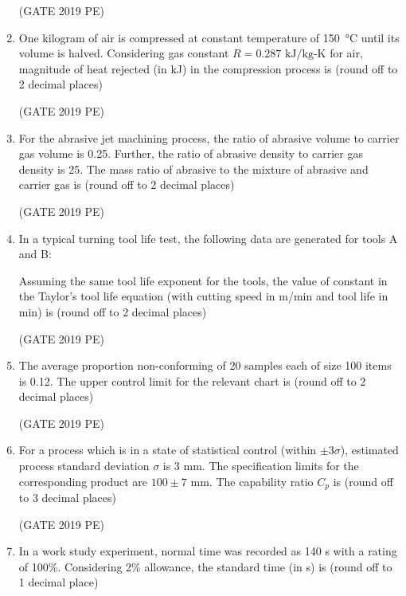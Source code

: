 \documentclass[journal,12pt,onecolumn]{exam}
\theoremstyle{remark}
\begin{document}
\begin{enumerate}
    \hfill{(GATE 2019 PE)}\\

    \item One kilogram of air is compressed at constant temperature of 150~°C until its volume is halved. Considering gas constant \(R = 0.287 \text{ kJ/kg-K}\) for air, magnitude of heat rejected (in kJ) in the compression process is  
    (round off to 2 decimal places)

    \hfill{(GATE 2019 PE)}\\

    \item For the abrasive jet machining process, the ratio of abrasive volume to carrier gas volume is 0.25. Further, the ratio of abrasive density to carrier gas density is 25. The mass ratio of abrasive to the mixture of abrasive and carrier gas is  
    (round off to 2 decimal places)

    \hfill{(GATE 2019 PE)}\\

    \item In a typical turning tool life test, the following data are generated for tools A and B: 
    

    Assuming the same tool life exponent for the tools, the value of constant in the Taylor's tool life equation (with cutting speed in m/min and tool life in min) is  
    (round off to 2 decimal places)

\hfill{(GATE 2019 PE)}\\
    \item The average proportion non-conforming of 20 samples each of size 100 items is 0.12. The upper control limit for the relevant chart is  
    (round off to 2 decimal places)

\hfill{(GATE 2019 PE)}\\
    \item For a process which is in a state of statistical control (within \(\pm 3 \sigma\)), estimated process standard deviation \(\sigma\) is 3 mm. The specification limits for the corresponding product are \(100 \pm 7\) mm. The capability ratio \(C_p\) is  
    (round off to 3 decimal places)

\hfill{(GATE 2019 PE)}\\
    \item In a work study experiment, normal time was recorded as 140 s with a rating of 100\%. Considering 2\% allowance, the standard time (in s) is  
    (round off to 1 decimal place)


\end{enumerate}
\end{document}
